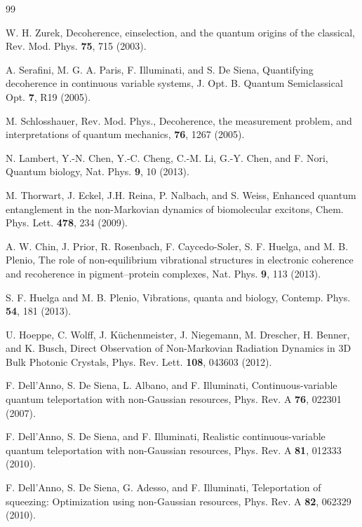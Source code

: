 \documentclass[prl,twocolumn,aps,floatfix,showpacs,tightenlines,superscriptaddress,amsmath,amssymb,amsfonts,10pt]{revtex4-1}
\begin{document}
\begin{thebibliography}{99}

W. H. Zurek, Decoherence, einselection, and the quantum origins of the classical, Rev. Mod. Phys. {\bf 75}, 715 (2003).

A. Serafini, M. G. A. Paris, F. Illuminati, and S. De Siena, Quantifying decoherence in continuous variable systems, J. Opt. B. Quantum Semiclassical Opt. {\bf 7}, R19 (2005).

M. Schlosshauer, Rev. Mod. Phys., Decoherence, the measurement problem, and interpretations of quantum mechanics, {\bf 76}, 1267 (2005).

N. Lambert, Y.-N. Chen, Y.-C. Cheng, C.-M. Li, G.-Y. Chen, and F. Nori, Quantum biology, Nat. Phys. {\bf 9}, 10 (2013).

M. Thorwart, J. Eckel, J.H. Reina, P. Nalbach, and S. Weiss, Enhanced quantum entanglement in the non-Markovian dynamics of biomolecular excitons, Chem. Phys. Lett. {\bf 478}, 234 (2009).

A. W. Chin, J. Prior, R. Rosenbach, F. Caycedo-Soler, S. F. Huelga, and M. B. Plenio, The role of non-equilibrium vibrational structures in electronic coherence and recoherence in pigment–protein complexes, Nat. Phys. {\bf 9}, 113 (2013).

S. F. Huelga and M. B. Plenio, Vibrations, quanta and biology, Contemp. Phys. {\bf 54}, 181 (2013).

U. Hoeppe, C. Wolff, J. K\"{u}chenmeister, J. Niegemann, M. Drescher, H. Benner, and K. Busch, Direct Observation of Non-Markovian Radiation Dynamics in 3D Bulk Photonic Crystals, Phys. Rev. Lett. {\bf 108}, 043603 (2012).

F. Dell'Anno, S. De Siena, L. Albano, and F. Illuminati, Continuous-variable quantum teleportation with non-Gaussian resources, Phys. Rev. A {\bf 76}, 022301 (2007).

F. Dell'Anno, S. De Siena, and F. Illuminati, Realistic continuous-variable quantum teleportation with non-Gaussian resources, Phys. Rev. A {\bf 81}, 012333 (2010).

F. Dell'Anno, S. De Siena, G. Adesso, and F. Illuminati, Teleportation of squeezing: Optimization using non-Gaussian resources, Phys. Rev. A {\bf 82}, 062329 (2010).


\end{thebibliography}
\end{document}
